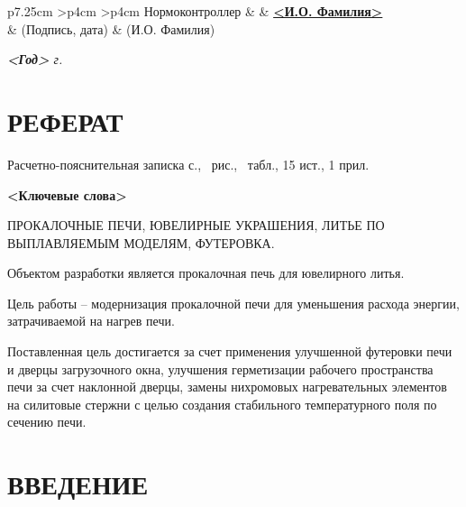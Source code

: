 \documentclass[utf8x, 14pt, oneside, a4paper]{article}
\newenvironment{signstabular}[1][1]{
	\renewcommand*{\arraystretch}{#1}
	\tabular
}{
	\endtabular
}
\begin{document}
\begin{titlepage}
\begin{table}[h!]
			\vspace{\baselineskip}

			\begin{signstabular}[0.7]{p{7.25cm} >{\centering\arraybackslash}p{4cm} >{\centering\arraybackslash}p{4cm}}
				Нормоконтроллер & \uline{\hspace*{4cm}} & \uline{\hfill \textbf{<И.О. Фамилия>} \hfill} \\
				& \scriptsize (Подпись, дата) & \scriptsize (И.О. Фамилия)
			\end{signstabular}
		\end{table}

		\vfill

		\begin{center}
			\normalsize \textit{\textbf{<Год>} г.}
		\end{center}
	\end{titlepage}
\pagebreak
	\normalsize
	\setcounter{page}{2}
	
		\section*{РЕФЕРАТ}
		\normalsize
			Расчетно-пояснительная записка \pageref{LastPage} с., \totalfigures\ рис., \totaltables\ табл., 15 ист., 1 прил.

			\textbf{<Ключевые слова>}
			
ПРОКАЛОЧНЫЕ ПЕЧИ, ЮВЕЛИРНЫЕ УКРАШЕНИЯ, ЛИТЬЕ ПО ВЫПЛАВЛЯЕМЫМ МОДЕЛЯМ, ФУТЕРОВКА.

Объектом разработки является прокалочная печь для ювелирного литья.

Цель работы -- модернизация прокалочной печи для уменьшения расхода энергии, затрачиваемой на нагрев печи.

Поставленная цель достигается за счет применения улучшенной футеровки печи и дверцы загрузочного окна, улучшения герметизации рабочего пространства печи за счет наклонной дверцы, замены нихромовых нагревательных элементов на силитовые стержни с целью создания стабильного температурного поля по сечению печи.


		\pagebreak
	
	\renewcommand{\contentsname}{\normalsize\bfseries\centering СОДЕРЖАНИЕ}
	\small
	\tableofcontents
	\normalsize

		\pagebreak

	\section*{ВВЕДЕНИЕ}
\end{document}
